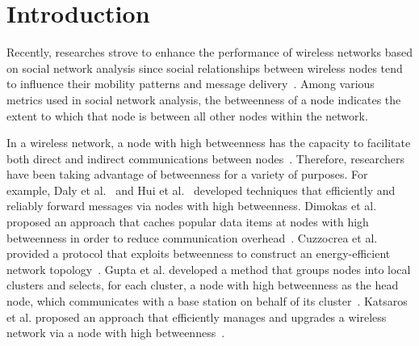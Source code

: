 \section{Introduction}
Recently, researches strove to enhance the performance of wireless networks based on social network analysis since social relationships between wireless nodes tend to influence their mobility patterns and message delivery~\cite{yelmzz, beyondDTN, bet-ady, bet-dnl}. 
Among various metrics used in social network analysis, the betweenness of a node indicates the extent to which that node is between all other nodes within the network.

In a wireless network, a node with high betweenness has the capacity to facilitate both direct and indirect communications between nodes~\cite{centrality, bet-ab}.
Therefore, researchers have been taking advantage of betweenness for a variety of purposes.
For example, Daly et al.~\cite{SIMBET} and Hui et al.~\cite{IEEE:bubble} developed techniques that efficiently and reliably forward messages via nodes with high betweenness.
Dimokas et al. proposed an approach that caches popular data items at nodes with high betweenness in order to reduce communication overhead~\cite{DimokasKM07}.
Cuzzocrea et al. provided a protocol that exploits betweenness to construct an energy-efficient network topology~\cite{bet-aady}.
Gupta et al. developed a method that groups nodes into local clusters and selects, for each cluster, a node with high betweenness as the head node, which communicates with a base station on behalf of its cluster~\cite{GuptaRS05}.
Katsaros et al. proposed an approach that efficiently manages and upgrades a wireless network via a node with high betweenness~\cite{bet-dnl}.

